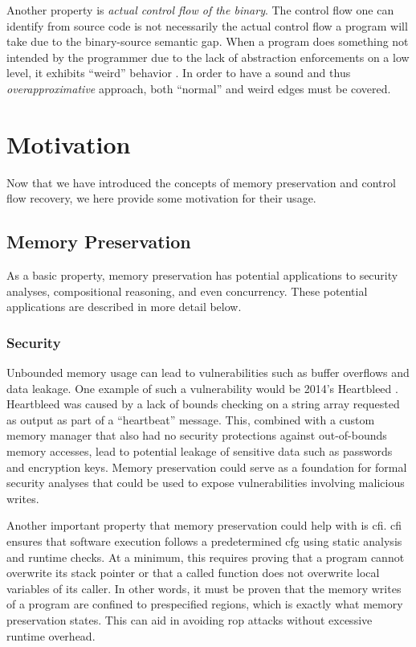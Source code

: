 Another property is \emph{actual control flow of the binary}.
The control flow one can identify from source code is not necessarily the actual control flow a program will take due to the binary-source semantic gap.
When a program does something not intended by the programmer due to the lack of abstraction enforcements on a low level, it exhibits ``weird'' behavior \autocite{shapiro2013weird,dullien2017weird}.
In order to have a sound and thus \emph{overapproximative} approach, both ``normal'' and weird edges must be covered.

\section{Motivation}
Now that we have introduced the concepts of memory preservation and control flow recovery, we here provide some motivation for their usage.

\subsection{Memory Preservation}
As a basic property, memory preservation has potential applications to security analyses, compositional reasoning, and even concurrency.
These potential applications are described in more detail below.

\subsubsection{Security}
Unbounded memory usage can lead to vulnerabilities such as buffer overflows and data leakage.
One example of such a vulnerability would be 2014's Heartbleed \autocite{heartbleed}.
Heartbleed was caused by a lack of bounds checking on a string array requested as output as part of a ``heartbeat'' message.
This, combined with a custom memory manager that also had no security protections against out-of-bounds memory accesses, lead to potential leakage of sensitive data such as passwords and encryption keys.
Memory preservation could serve as a foundation for formal security analyses that could be used to expose vulnerabilities involving malicious writes.

Another important property that memory preservation could help with is \ac{cfi}.
\Ac{cfi} ensures that software execution follows a predetermined \ac{cfg} using static analysis and runtime checks.
At a minimum, this requires proving that a program cannot overwrite its stack pointer or that a called function does not overwrite local variables of its caller.
In other words, it must be proven that the memory writes of a program are confined to prespecified regions, which is exactly what memory preservation states.
This can aid in avoiding \ac{rop} attacks without excessive runtime overhead.

